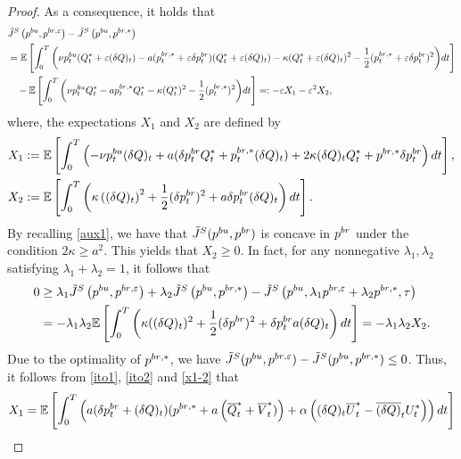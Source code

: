 \documentclass[10pt,a4paper]{amsart}
\begin{document}
\begin{proof}
As a consequence, it holds that 
{\small\begin{align*}
&\tilde{J}^S\left(p^{{\rm bu}}, p^{{\rm br}, \varepsilon}\right)-\tilde{J}^S\left(p^{{\rm bu}}, p^{{\rm br},*}\right)\nonumber\\
&=\mathbb{E}\left[\int_0^T\bigg(\nu p_t^{{\rm bu}}(Q_t^*+\varepsilon (\delta Q)_t)-a(p_t^{{\rm br},*}+\varepsilon \delta p_t^{{\rm br}})(Q_t^*+\varepsilon (\delta Q)_t)-\kappa(Q_t^*+\varepsilon (\delta Q)_t)^2-\frac{1}{2}(p_t^{{\rm br},*}+\varepsilon \delta p_t^{{\rm br}})^2\bigg)dt\right]\nonumber\\
&\quad-\mathbb{E}\left[\int_0^T\bigg(\nu p_t^{{\rm bu}}Q_t^*-ap_t^{{\rm br},*}Q_t^*-\kappa(Q_t^*)^2-\frac{1}{2}(p_t^{{\rm br},*})^2\bigg)dt\right]=:-\varepsilon X_1-\varepsilon^2 X_2,
\end{align*}}where, the expectations $X_1$ and $X_2$ are defined by
\begin{align}\label{x1-2}
X_1&:=\mathbb{E}\left[\int_0^T\left(-\nu p_t^{{\rm bu}}(\delta Q)_t+a(\delta p_t^{{\rm br}}Q_t^*+p_t^{{\rm br},*}(\delta Q)_t)+2\kappa (\delta Q)_t Q_t^*+p^{{\rm br},*}\delta p_t^{{\rm br}}\right)dt\right],\nonumber\\
X_2&:=\mathbb{E}\left[\int_0^T\left( \kappa\left((\delta Q)_t\right)^2+\frac{1}{2}(\delta p_t^{{\rm br}})^2+a\delta p_t^{{\rm br}}(\delta Q)_t\right)dt\right].
\end{align}
By recalling \eqref{aux1}, we have that $\tilde{J}^S(p^{{\rm bu}}, p^{{\rm br}})$ is concave in $p^{{\rm br}}$ under the condition $ 2\kappa\geq a^2$. This yields that $X_2\geq 0$. In fact, for any nonnegative $\lambda_1,\lambda_2$ satisfying $\lambda_1+\lambda_2=1$, it follows that %
\begin{align*}
0&\geq \lambda_1\tilde{J}^S\left(p^{{\rm bu}}, p^{{\rm br}, \varepsilon}\right)+\lambda_2\tilde{J}^S\left(p^{{\rm bu}}, p^{{\rm br},*}\right)-\tilde{J}^S\left(p^{{\rm bu}}, \lambda_1p^{br, \varepsilon}+\lambda_2p^{{\rm br},*}, \tau\right)\\
&=-\lambda_1\lambda_2\mathbb{E}\left[\int_0^T\left(\kappa((\delta Q)_t)^2+\frac{1}{2}(\delta p^{{\rm br}})^2+\delta p_t^{{\rm br}}a(\delta Q)_t\right)dt\right]=-\lambda_1\lambda_2X_2.
\end{align*}
Due to the optimality of $p^{{\rm br},*}$, we have $\tilde{J}^S(p^{{\rm bu}}, p^{{\rm br}, \varepsilon})-\tilde{J}^S(p^{{\rm bu}}, p^{{\rm br},*})\leq 0$. Thus, it follows from \eqref{ito1}, \eqref{ito2} and \eqref{x1-2} that
\begin{align*}
X_1&=\mathbb{E}\left[\int_0^T\left(a(\delta p_t^{{\rm br}}+(\delta Q)_t)(p^{{\rm br},*}+a\left( \overline{Q}_t^*+ \overline{V}_t^*)\right)+\alpha \left((\delta Q)_t\overline{U}_t^*-\overline{(\delta Q)}_tU_t^*\right)\right)dt\right]\\

\end{align*}
\end{proof}
\end{document}
